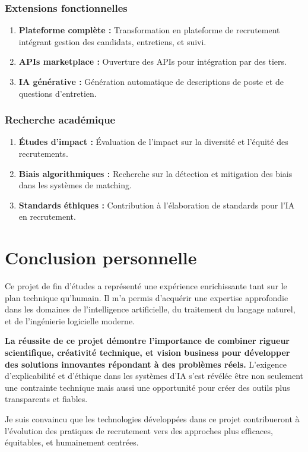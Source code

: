 \documentclass[12pt,a4paper]{report}
\begin{document}
\subsubsection{Extensions fonctionnelles}

\begin{enumerate}
\item {\color{darkgreen}\textbf{Plateforme complète :}} Transformation en plateforme de recrutement intégrant gestion des candidats, entretiens, et suivi.

\item {\color{primarygreen}\textbf{APIs marketplace :}} Ouverture des APIs pour intégration par des tiers.

\item {\color{darkgreen}\textbf{IA générative :}} Génération automatique de descriptions de poste et de questions d'entretien.
\end{enumerate}

\subsubsection{Recherche académique}

\begin{enumerate}
\item {\color{primarygreen}\textbf{Études d'impact :}} Évaluation de l'impact sur la diversité et l'équité des recrutements.

\item {\color{darkgreen}\textbf{Biais algorithmiques :}} Recherche sur la détection et mitigation des biais dans les systèmes de matching.

\item {\color{primarygreen}\textbf{Standards éthiques :}} Contribution à l'élaboration de standards pour l'IA en recrutement.
\end{enumerate}

\section{Conclusion personnelle}

Ce projet de fin d'études a représenté une expérience enrichissante tant sur le plan technique qu'humain. Il m'a permis d'acquérir une expertise approfondie dans les domaines de l'intelligence artificielle, du traitement du langage naturel, et de l'ingénierie logicielle moderne.

{\color{primarygreen}\large\textbf{La réussite de ce projet démontre l'importance de combiner rigueur scientifique, créativité technique, et vision business pour développer des solutions innovantes répondant à des problèmes réels.}} L'exigence d'explicabilité et d'éthique dans les systèmes d'IA s'est révélée être non seulement une contrainte technique mais aussi une opportunité pour créer des outils plus transparents et fiables.

Je suis convaincu que les technologies développées dans ce projet contribueront à l'évolution des pratiques de recrutement vers des approches plus efficaces, équitables, et humainement centrées.
\end{document}
